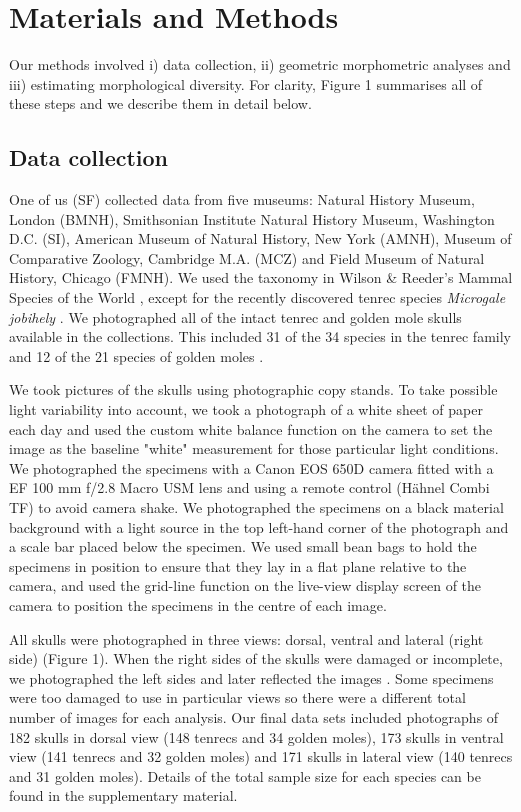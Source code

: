 \documentclass[12pt,a4paper]{article}
\begin{document}
\section{Materials and Methods}

	Our methods involved i) data collection, ii) geometric morphometric analyses and iii) estimating morphological diversity. For clarity,  Figure 1 summarises all of these steps and we describe them in detail below.  	
	
\subsection{Data collection}
	One of us (SF) collected data from five museums: Natural History Museum, London (BMNH), Smithsonian Institute Natural History Museum, Washington D.C. (SI), American Museum of Natural History, New York (AMNH), Museum of Comparative Zoology, Cambridge M.A. (MCZ) and Field Museum of Natural History, Chicago (FMNH). We used the taxonomy in Wilson \& Reeder's Mammal Species of the World \citeyearpar{Wilson2005}, except for the recently discovered tenrec species \textit{Microgale jobihely} \citep{Goodman2006}. We photographed all of the intact tenrec and golden mole skulls available in the collections. This included 31 of the 34 species in the tenrec family \citep{Olson2013} and 12 of the 21 species of golden moles \citep{Wilson2005}.
	
	We took pictures of the skulls using photographic copy stands. To take possible light variability into account, we took a photograph of a white sheet of paper each day and used the custom white balance function on the camera to set the image as the baseline "white" measurement for those particular light conditions. We photographed the specimens with a Canon EOS 650D camera fitted with a EF 100 mm f/2.8 Macro USM lens and using a remote control (H\"ahnel Combi TF) to avoid camera shake. We photographed the specimens on a black material background with a light source in the top left-hand corner of the photograph and a scale bar placed below the specimen. We used small bean bags to hold the specimens in position to ensure that they lay in a flat plane relative to the camera, and used the grid-line function on the live-view display screen of the camera to position the specimens in the centre of each image. 
	
	All skulls were photographed in three views: dorsal, ventral and lateral (right side) (Figure 1). When the right sides of the skulls were damaged or incomplete, we photographed the left sides and later reflected the images \citep[e.g.][]{Barrow2008}. Some specimens were too damaged to use in particular views so there were a different total number of images for each analysis. Our final data sets included photographs of 182 skulls in dorsal view (148 tenrecs and 34 golden moles), 173 skulls in ventral view (141 tenrecs and 32 golden moles) and 171 skulls in lateral view (140 tenrecs and 31 golden moles). Details of the total sample size for each species can be found in the supplementary material. 
	
\end{document}
